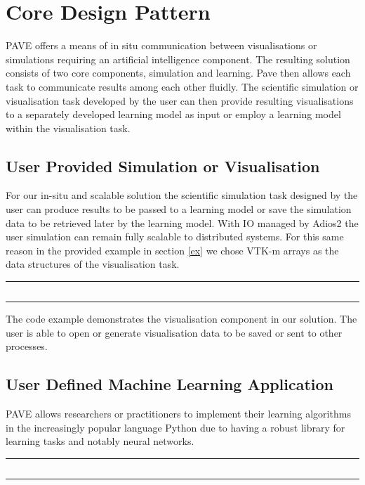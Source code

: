 \section{Core Design Pattern}
 
PAVE offers a means of in situ communication between visualisations or simulations requiring an artificial intelligence component. The resulting solution consists of two core components, simulation and learning. Pave then allows each task to communicate results among each other fluidly. The scientific simulation or visualisation task developed by the user can then provide resulting visualisations to a separately developed learning model as input or employ a learning model within the visualisation task.  

\subsection{User Provided Simulation or Visualisation}

For our in-situ and scalable solution the scientific simulation task designed by the user can produce results to be passed to a learning model or save the simulation data to be retrieved later by the learning model. With IO managed by Adios2 the user simulation can remain fully scalable to distributed systems. For this same reason in the provided example in section \ref{ex} we chose VTK-m arrays as the data structures of the visualisation task.
\noindent\rule{0.5\textwidth}{1pt}
\inputminted{cpp}{pave_pt.py}\label{PAVEvis}
\noindent\rule{0.5\textwidth}{1pt}

The code example  demonstrates the visualisation component in our solution. The user is able to open or generate visualisation data to be saved or sent to other processes. 

\subsection{User Defined Machine Learning Application}

PAVE allows researchers or practitioners to implement their learning algorithms in the increasingly popular language Python due to having a robust library for learning tasks and notably neural networks. 

\noindent\rule{0.5\textwidth}{1pt}\label{PAVElearn}
\inputminted{python}{pave.py}
\noindent\rule{0.5\textwidth}{1pt}

